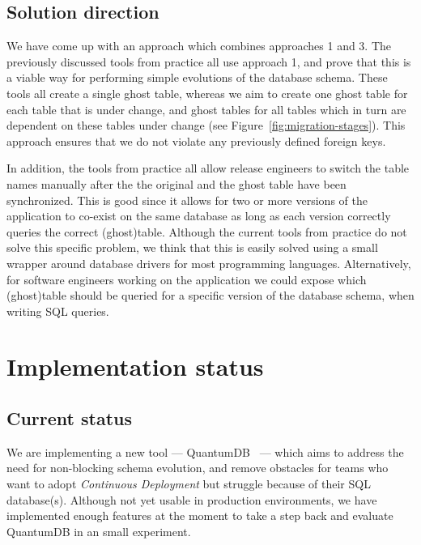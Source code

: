 \documentclass[conference]{IEEEtran}
\begin{document}
\subsection{Solution direction}

We have come up with an approach which combines approaches 1 and 3. The previously discussed tools from practice all use approach 1, and prove that this is a viable way for performing simple evolutions of the database schema. These tools all create a single ghost table, whereas we aim to create one ghost table for each table that is under change, and ghost tables for all tables which in turn are dependent on these tables under change (see Figure~\ref{fig:migration-stages}). This approach ensures that we do not violate any previously defined foreign keys.

In addition, the tools from practice all allow release engineers to switch the table names manually after the the original and the ghost table have been synchronized. This is good since it allows for two or more versions of the application to co-exist on the same database as long as each version correctly queries the correct (ghost)table. Although the current tools from practice do not solve this specific problem, we think that this is easily solved using a small wrapper around database drivers for most programming languages. Alternatively, for software engineers working on the application we could expose which (ghost)table should be queried for a specific version of the database schema, when writing SQL queries.

\section{Implementation status} %

\subsection{Current status}

We are implementing a new tool --- QuantumDB~\cite{QuantumDB} --- which aims to address the need for non-blocking schema evolution, and remove obstacles for teams who want to adopt \textit{Continuous Deployment} but struggle because of their SQL database(s). Although not yet usable in production environments, we have implemented enough features at the moment to take a step back and evaluate QuantumDB in an small experiment. 
\end{document}
